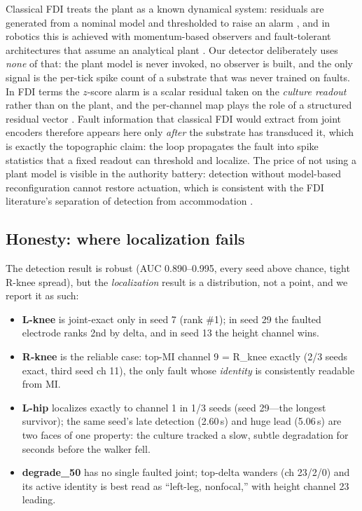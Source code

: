 Classical FDI treats the plant as a known dynamical system: residuals are
generated from a nominal model and thresholded to raise an alarm
\cite{venkatasubramanian2003,isermann2005,chen1999}, and in robotics this is
achieved with momentum-based observers and fault-tolerant architectures that
assume an analytical plant \cite{deluca2003fdi,visinsky1995fdi}. Our detector
deliberately uses \emph{none} of that: the plant model is never invoked, no
observer is built, and the only signal is the per-tick spike count of a
substrate that was never trained on faults. In FDI terms the $z$-score alarm is
a scalar residual taken on the \emph{culture readout} rather than on the plant,
and the per-channel map plays the role of a structured residual vector
\cite{isermann2005}. Fault information that classical FDI would extract from
joint encoders therefore appears here only \emph{after} the substrate has
transduced it, which is exactly the topographic claim: the loop propagates the
fault into spike statistics that a fixed readout can threshold and localize.
The price of not using a plant model is visible in the authority battery:
detection without model-based reconfiguration cannot restore actuation, which
is consistent with the FDI literature's separation of detection from
accommodation \cite{chen1999,isermann2005}.

\subsection{Honesty: where localization fails}

The detection result is robust (AUC 0.890--0.995, every seed above chance,
tight R-knee spread), but the \emph{localization} result is a distribution, not
a point, and we report it as such:
\begin{itemize}
\item \textbf{L-knee} is joint-exact only in seed 7 (rank \#1); in seed 29 the
      faulted electrode ranks 2nd by delta, and in seed 13 the height channel
      wins.
\item \textbf{R-knee} is the reliable case: top-MI channel 9 = R\_knee exactly
      (2/3 seeds exact, third seed ch 11), the only fault whose \emph{identity}
      is consistently readable from MI.
\item \textbf{L-hip} localizes exactly to channel 1 in 1/3 seeds (seed 29---the
      longest survivor); the same seed's late detection (2.60\,s) and huge lead
      (5.06\,s) are two faces of one property: the culture tracked a slow,
      subtle degradation for seconds before the walker fell.
\item \textbf{degrade\_50} has no single faulted joint; top-delta wanders
      (ch 23/2/0) and its active identity is best read as ``left-leg,
      nonfocal,'' with height channel 23 leading.
\end{itemize}

